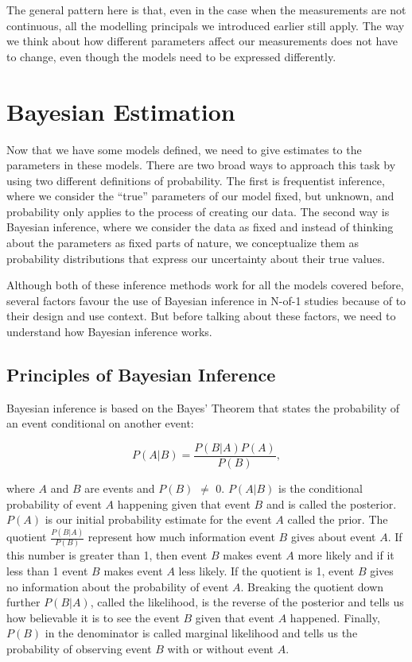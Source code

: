 \documentclass[12pt,a4paper,leqno]{report}
\theoremstyle{plain}
\theoremstyle{definition}
\theoremstyle{remark}
\begin{document}
The general pattern here is that, even in the case when the measurements are not
continuous, all the modelling principals we introduced earlier still apply. The way we
think about how different parameters affect our measurements does not have to change,
even though the models need to be expressed differently.

\chapter{Bayesian Estimation}\label{bayes}

Now that we have some models defined, we need to give estimates to the parameters in these models. There
are two broad ways to approach this task by using two different definitions of
probability. The first is frequentist inference, where we consider the ``true''
parameters of our model fixed, but unknown, and probability only applies to the
process of creating our data. The second way is Bayesian inference, where we
consider the data as fixed and instead of thinking about the parameters as
fixed parts of nature, we conceptualize them as probability distributions that
express our uncertainty about their true values.

Although both of these inference methods work for all the models covered before,
several factors favour the use of Bayesian inference in N-of-1
studies because of to their design and use context. But before talking about these factors,
we need to understand how Bayesian inference works.

\section{Principles of Bayesian Inference}\label{whybayes}

Bayesian inference is based on the Bayes' Theorem that states the probability of
an event conditional on another event:

\begin{def}\label{}
    \begin{equation}\label{bayesrule}
        P(A|B) = \frac{P(B|A)P(A)}{P(B)},
    \end{equation}
\end{def}where \(A\) and \(B\) are events and \(P(B)\) \(\neq \) 0. \(P(A|B)\) is the conditional probability of event \(A\) happening given that
event \(B\) and is called the posterior. \(P(A)\) is our initial
probability estimate for the event \(A\) called the prior. The quotient
\(\frac{P(B|A)}{P(B)}\) represent how much information event \(B\) gives about
event \(A\). If this number is greater than 1, then event \(B\)
makes event \(A\) more likely and if it less than 1 event \(B\) makes event \(A\) less likely.
If the quotient is 1, event \(B\) gives no information about the probability of
event \(A\). Breaking the quotient down further \(P(B|A)\), called the likelihood, is the reverse of the posterior and tells us how believable it is to
see the event \(B\) given that event \(A\) happened. Finally, \(P(B)\) in the denominator is called marginal likelihood and tells us the probability of
observing event \(B\) with or without event \(A\).
\end{document}
